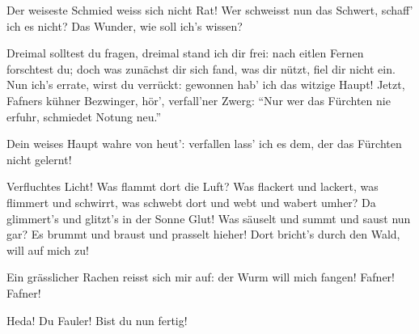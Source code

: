 \begin{drama}

Der weiseste Schmied
weiss sich nicht Rat!
Wer schweisst nun das Schwert,
schaff' ich es nicht?
Das Wunder, wie soll ich's wissen?

\Wandererspeaks


Dreimal solltest du fragen,
dreimal stand ich dir frei:
nach eitlen Fernen
forschtest du;
doch was zunächst dir sich fand,
was dir nützt, fiel dir nicht ein.
Nun ich's errate,
wirst du verrückt:
gewonnen hab' ich
das witzige Haupt!
Jetzt, Fafners kühner Bezwinger,
hör', verfall'ner Zwerg:
``Nur wer das Fürchten
nie erfuhr,
schmiedet Notung neu.''


Dein weises Haupt
wahre von heut':
verfallen lass' ich es dem,
der das Fürchten nicht gelernt!


\scene

\Mimespeaks


Verfluchtes Licht!
Was flammt dort die Luft?
Was flackert und lackert,
was flimmert und schwirrt,
was schwebt dort und webt
und wabert umher?
Da glimmert's und glitzt's
in der Sonne Glut!
Was säuselt und summt
und saust nun gar?
Es brummt und braust
und prasselt hieher!
Dort bricht's durch den Wald,
will auf mich zu!


Ein grässlicher Rachen
reisst sich mir auf:
der Wurm will mich fangen!
Fafner! Fafner!


\Siegfriedspeaks


Heda! Du Fauler!
Bist du nun fertig!



\end{drama}
